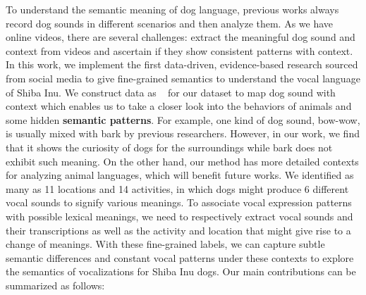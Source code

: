 To understand the semantic meaning of dog language, previous works always record dog sounds in different scenarios and then analyze them. As we have online videos, there are several challenges: extract the meaningful dog sound and context from videos and ascertain if they show consistent patterns with context. In this work, we implement the first data-driven, evidence-based research sourced from social media to give fine-grained semantics to understand the vocal language of Shiba Inu. We construct data as ~ for our dataset to map dog sound with context which enables us to take a closer look into the behaviors of animals and some hidden \textbf{semantic patterns}. For example, one kind of dog sound, bow-wow, is usually mixed with bark by previous researchers. However, in our work, we find that it shows the curiosity of dogs for the surroundings while bark does not exhibit such meaning. 
On the other hand, our method has more detailed contexts for analyzing animal languages, which will benefit future works. We identified as many as 11 locations and 14 activities, in which dogs might produce 6 different vocal sounds to signify various meanings. To associate vocal expression patterns with possible lexical meanings, we need to respectively extract vocal sounds and their transcriptions as well as the activity and location that might give rise to a change of meanings. With these fine-grained labels, we can capture subtle semantic differences and constant vocal patterns under these contexts to explore the semantics of vocalizations for Shiba Inu dogs.
Our main contributions can be summarized as follows:
 
